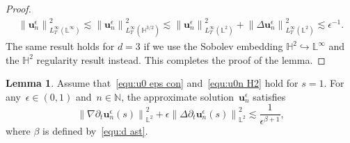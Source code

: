 \documentclass[11pt,reqno]{amsart}
\theoremstyle{definition}
\newtheorem{lemma}[theorem]{Lemma}
\numberwithin{equation}{section}
\newcommand{\bff}{\boldsymbol}
\newcommand{\bb}{\mathbb}
\newcommand{\ddt}{\frac{\mathrm{d}}{\mathrm{d}t}}
\newcommand{\pa}{\partial}
\newcommand{\norm}[2]{\left\|{#1}\right\|_{#2}}
\newcommand{\inpro}[2]{\left\langle#1,#2\right\rangle}
\begin{document}
\begin{proof}
\begin{align}
	\norm{\bff{u}_n^\epsilon}{L^\infty_T(\bb{L}^\infty)}^2
    \lesssim
    \norm{\bff{u}_n^\epsilon}{L^\infty_T(\bb{H}^{3/2})}^2
	\lesssim
	\norm{\bff{u}_n^\epsilon}{L^\infty_T(\bb{L}^2)}^2
	+
	\norm{\Delta \bff{u}_n^\epsilon}{L^\infty_T(\bb{L}^2)}^2
	\lesssim
	\epsilon^{-1}.
\end{align}
The same result holds for $d=3$ if we use the Sobolev embedding $\bb{H}^2\hookrightarrow \bb{L}^\infty$ and the $\bb{H}^2$ regularity result instead.
This completes the proof of the lemma.
\end{proof}


\begin{lemma}\label{lem:ene est 3}
	Assume that~\eqref{equ:u0 eps con} and~\eqref{equ:u0n H2} hold for $s=1$. 
	For any~$\epsilon\in(0,1)$ and~$n\in\bb{N}$, the approximate
	solution~$\bff{u}_n^\epsilon$ satisfies
\begin{equation}\label{equ:pat Lap une}
	\norm{\nabla\pa_t\bff{u}_n^\epsilon(s)}{\bb{L}^2}^2 
	+
 	\epsilon\norm{\Delta\pa_t\bff{u}_n^\epsilon(s)}{\bb{L}^2}^2 
 	\lesssim 
	\frac{1}{\epsilon^{\beta+1}},
\end{equation}
where $\beta$ is defined by~\eqref{equ:d ast}.
\end{lemma}
\end{document}
